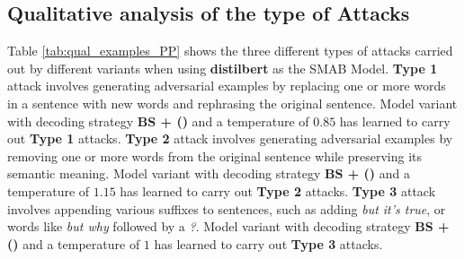 \subsection{Qualitative analysis of the type of Attacks}
\label{sec:appendix_qual_examples_RT}
Table \ref{tab:qual_examples_PP} shows the three different types of attacks carried out by different variants when using \textbf{distilbert} as the SMAB Model.  \textbf{Type 1} attack involves generating adversarial examples by replacing one or more words in a sentence with new words and rephrasing the original sentence. Model variant with decoding strategy \textbf{BS + ()} and a temperature of $0.85$  has learned to carry out \textbf{Type 1} attacks.  \textbf{Type 2} attack involves generating adversarial examples by removing one or more words from the original sentence while preserving its semantic meaning. Model variant with decoding strategy \textbf{BS + ()} and a temperature of $1.15$  has learned to carry out \textbf{Type 2} attacks.  \textbf{Type 3} attack involves appending various suffixes to sentences, such as adding \textit{but it's true}, or words like \textit{but why} followed by a \textit{?}. Model variant with decoding strategy \textbf{BS + ()} and a temperature of $1$  has learned to carry out \textbf{Type 3} attacks.

